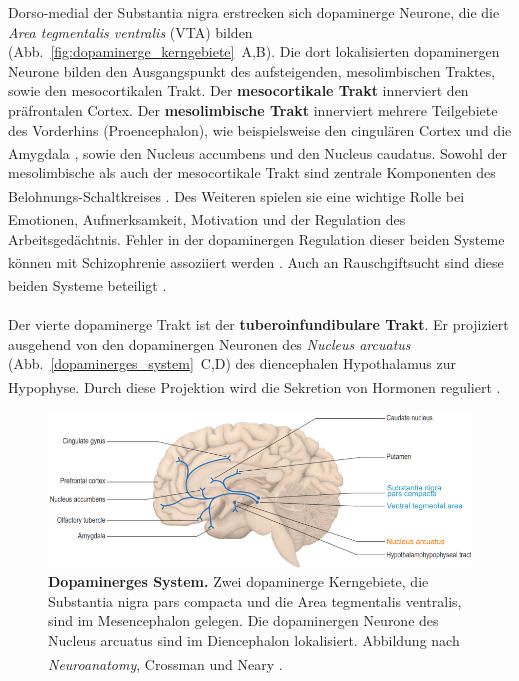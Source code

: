 Dorso-medial der Substantia nigra erstrecken sich dopaminerge Neurone, die die \textit{Area tegmentalis ventralis} (VTA) bilden (Abb.~\ref{fig:dopaminerge_kerngebiete}~A,B). Die dort lokalisierten dopaminergen Neurone bilden den Ausgangspunkt des aufsteigenden, mesolimbischen Traktes, sowie den mesocortikalen Trakt. Der \textbf{mesocortikale Trakt} innerviert den präfrontalen Cortex. Der \textbf{mesolimbische Trakt} innerviert mehrere Teilgebiete des Vorderhins (Proencephalon), wie beispielsweise den cingulären Cortex und die Amygdala \textsuperscript{\cite[Kap.~9]{crossman2014neuroanatomy}}, sowie den Nucleus accumbens und den Nucleus caudatus.
Sowohl der mesolimbische als auch der mesocortikale Trakt sind zentrale Komponenten des Belohnungs-Schaltkreises \textsuperscript{\cite[Kap.~49]{kandel2013principles}}.
Des Weiteren spielen sie eine wichtige Rolle bei Emotionen, Aufmerksamkeit, Motivation \textsuperscript{\cite[Kap.~13]{kandel2013principles}} und der Regulation des Arbeitsgedächtnis. Fehler in der dopaminergen Regulation dieser beiden Systeme können mit Schizophrenie assoziiert werden \textsuperscript{\cite[Kap.~67]{kandel2013principles}}.
Auch an Rauschgiftsucht sind diese beiden Systeme beteiligt \textsuperscript{\cite[Kap.~13]{kandel2013principles}}.
\\
\\
Der vierte dopaminerge Trakt ist der \textbf{tuberoinfundibulare Trakt}. Er projiziert ausgehend von den dopaminergen Neuronen des \textit{Nucleus arcuatus} (Abb.~\ref{dopaminerges_system}~C,D) des diencephalen Hypothalamus zur Hypophyse. Durch diese Projektion wird die Sekretion von Hormonen reguliert \textsuperscript{\cite[Kap.~13]{kandel2013principles}}.

\begin{figure}[H]
    \centering
    \includegraphics[width=\textwidth]{pictures/Bilder_monoamine_systeme/dopaminerges_system.PNG}
    \caption[Dopaminerges System]{\textbf{Dopaminerges System.} Zwei dopaminerge Kerngebiete, die Substantia nigra pars compacta und die Area tegmentalis ventralis, sind im Mesencephalon gelegen. Die dopaminergen Neurone des Nucleus arcuatus sind im Diencephalon lokalisiert. Abbildung nach \textit{Neuroanatomy}, Crossman und Neary
    \textsuperscript{\cite[Kap.~9]{crossman2014neuroanatomy}}.}
    \label{fig:dopaminerges_system}
\end{figure}
